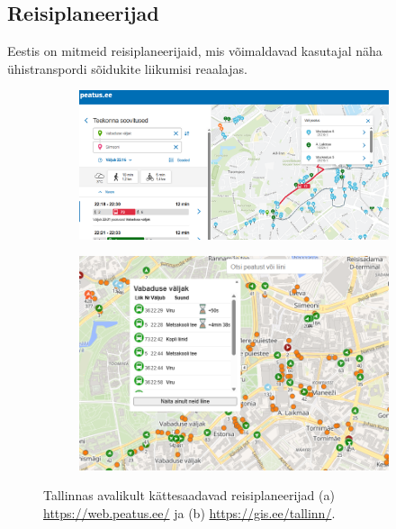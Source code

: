 \subsection{Reisiplaneerijad}

Eestis on mitmeid reisiplaneerijaid, mis võimaldavad kasutajal näha ühistranspordi sõidukite liikumisi reaalajas. 

\begin{figure}[h!]
    \centering
    \begin{subfigure}{0.45\textwidth}
        \centering
        \includegraphics[width=\textwidth]{figures/peatus.png}
        \caption{}
        \label{fig:Peatus.ee}
    \end{subfigure}
    \hfill
    \begin{subfigure}{0.45\textwidth}
        \centering
        \includegraphics[width=\textwidth]{figures/gis.png}
        \caption{}
        \label{fig:https://gis.ee/tallinn/}
    \end{subfigure}
    \caption{Tallinnas avalikult kättesaadavad reisiplaneerijad (a) \url{https://web.peatus.ee/} ja (b) \url{https://gis.ee/tallinn/}.}
    \label{fig:combined}
\end{figure}

